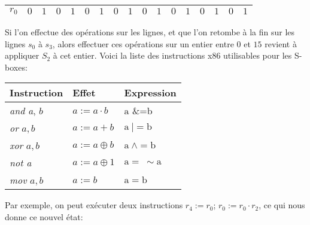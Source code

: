 \documentclass{article}
\begin{document}
\begin{center}
\begin{tabular}{|l|l|l|l|l|l|l|l|l|l|l|l|l|l|l|l|l|}
\hline
\multicolumn{1}{|l|}{ $r_{0}$}&	\multicolumn{1}{|l|}{ $0$}&	\multicolumn{1}{|l|}{ $1$}&	\multicolumn{1}{|l|}{ $0$}&	\multicolumn{1}{|l|}{ $1$}&	\multicolumn{1}{|l|}{ $0$}&	\multicolumn{1}{|l|}{ $1$}&	\multicolumn{1}{|l|}{ $0$}&	\multicolumn{1}{|l|}{ $1$}&	\multicolumn{1}{|l|}{ $0$}&	\multicolumn{1}{|l|}{ $1$}&	\multicolumn{1}{|l|}{ $0$}&	\multicolumn{1}{|l|}{ $1$}&	\multicolumn{1}{|l|}{ $0$}&	\multicolumn{1}{|l|}{ $1$}&	\multicolumn{1}{|l|}{ $0$}&	\multicolumn{1}{|l|}{ $1$}	\\
\hline
\end{tabular}
\end{center}
\medbreak
 Si l'on effectue des opérations sur les lignes, et que l'on retombe à la fin sur les lignes $s_{0}$ à $s_{3}$, alors effectuer ces opérations sur un entier entre $0$ et $15$ revient à appliquer $S_{2}$ à cet entier. 
Voici la liste des instructions x86 utilisables pour les S-boxes:
\medbreak
\begin{center}
\begin{tabular}{|l|l|l|}
\hline
\multicolumn{1}{|l|}{Instruction}&	\multicolumn{1}{|l|}{Effet}&	\multicolumn{1}{|l|}{Expression}	\\
\hline
\multicolumn{1}{|l|}{{\it and a}, $b$}&	\multicolumn{1}{|l|}{ $a:=a\cdot b$}&	\multicolumn{1}{|l|}{ $\mathrm{a}$ \&=b}	\\
\hline
\multicolumn{1}{|l|}{{\it or} $a,b$}&	\multicolumn{1}{|l|}{ $a:=a+b$}&	\multicolumn{1}{|l|}{ $\mathrm{a}\ |=\mathrm{b}$}	\\
\hline
\multicolumn{1}{|l|}{{\it xor} $a,b$}&	\multicolumn{1}{|l|}{ $a:=a\oplus b$}&	\multicolumn{1}{|l|}{ $\mathrm{a}\ \wedge=\mathrm{b}$}	\\
\hline
\multicolumn{1}{|l|}{{\it not a}}&	\multicolumn{1}{|l|}{$a:=a\oplus 1$}&	\multicolumn{1}{|l|}{ $\mathrm{a}=\ \sim \mathrm{a}$}	\\
\hline
\multicolumn{1}{|l|}{{\it mov} $a, b$}&	\multicolumn{1}{|l|}{ $a:=b$}&	\multicolumn{1}{|l|}{ $\mathrm{a}=\mathrm{b}$}	\\
\hline
\end{tabular}
\end{center}
\medbreak
Par exemple, on peut exécuter deux instructions $r_{4} := r_{0}$; $r_{0} :=r_{0}\cdot r_{2}$, ce qui nous donne ce nouvel état:
\medbreak
\end{document}
